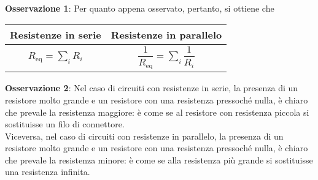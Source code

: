 \documentclass[a4paper]{extarticle}
\begin{document}
\vspace{1em}
\noindent
\textbf{Osservazione 1}: Per quanto appena osservato, pertanto, si ottiene che

\vspace{1em}
\noindent
\begin{table}[H]
  \centering
  \begin{tabular}{|c|c|}
    \hline
    Resistenze in serie & Resistenze in parallelo\\
    \hline
    $\displaystyle{R_\text{eq} = \sum_i R_i}$ & $\displaystyle{\dfrac{1}{R_\text{eq}} = \sum_i \dfrac{1}{R_i}}$\\
    \hline
\end{tabular}
\end{table}

\vspace{2em}
\noindent
\textbf{Osservazione 2}: Nel caso di circuiti con resistenze in serie, la presenza di un resistore molto grande e un resistore con una resistenza pressoché nulla, è chiaro che prevale la resistenza maggiore: è come se al resistore con resistenza piccola si sostituisse un filo di connettore.\\
Viceversa, nel caso di circuiti con resistenze in parallelo, la presenza di un resistore molto grande e un resistore con una resistenza pressoché nulla, è chiaro che prevale la resistenza minore: è come se alla resistenza più grande si sostituisse una resistenza infinita.\\
\end{document}
